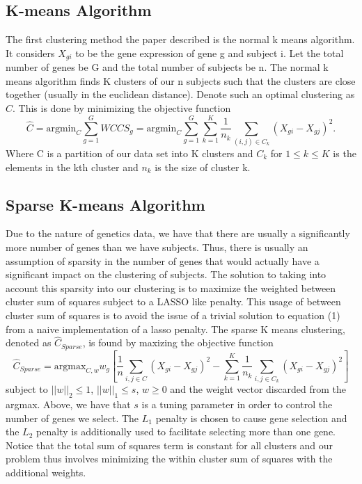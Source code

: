 \documentclass{statsoc}
\begin{document}
\subsection{K-means Algorithm}

The first clustering method the paper described is the normal k means algorithm. It considers $X_{gi}$ to be the gene expression of gene g and subject i. Let the total number of genes be G and the total number of subjects be n. The normal k means algorithm finds K clusters of our n subjects such that the clusters are close together (usually in the euclidean distance). Denote such an optimal clustering as $\hat{C}$. This is done by minimizing the objective function 
\begin{equation}
    \hat{C} = \textrm{argmin}_C \sum_{g=1}^G WCCS_g = \textrm{argmin}_C \sum_{g=1}^G \sum_{k = 1}^K \frac{1}{n_k} \sum_{(i,j) \in C_k} (X_{gi} - X_{gj})^2. 
\end{equation}
Where C is a partition of our data set into K clusters and $C_k$ for $1\leq k \leq K$ is the elements in the kth cluster and $n_k$ is the size of cluster k.

\subsection{Sparse K-means Algorithm}

Due to the nature of genetics data, we have that there are usually a significantly more number of genes than we have subjects. Thus, there is usually an assumption of sparsity in the number of genes that would actually have a significant impact on the clustering of subjects. The solution to taking into account this sparsity into our clustering is to maximize the weighted between cluster sum of squares subject to a LASSO like penalty. This usage of between cluster sum of squares is to avoid the issue of a trivial solution to equation (1) from a naive implementation of a lasso penalty. The sparse K means clustering, denoted as $\hat{C}_{Sparse}$, is found by maxizing the objective function 
\begin{equation}
    \hat{C}_{Sparse} = \textrm{argmax}_{C,w} w_g\left[\frac{1}{n} \sum_{i,j \in C} (X_{gi} - X_{gj})^2 - \sum_{k=1}^K \frac{1}{n_k}\sum_{i,j \in C_k} (X_{gi} - X_{gj})^2 \right]
\end{equation}
subject to $||w||_2 \leq 1$, $||w||_1 \leq s$, $w \geq 0$ and the weight vector discarded from the argmax. Above, we have that $s$ is a tuning parameter in order to control the number of genes we select. The $L_1$ penalty is chosen to cause gene selection and the $L_2$ penalty is additionally used to facilitate selecting more than one gene. Notice that the total sum of squares term is constant for all clusters and our problem thus involves minimizing the within cluster sum of squares with the additional weights.
    
\end{document}
